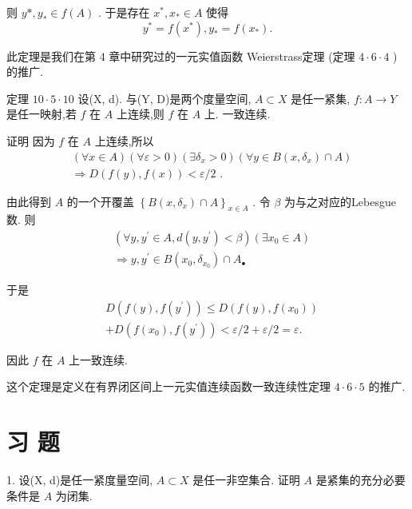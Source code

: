 则 $y * ,{y}_{ * } \in  f\left( A\right)$ . 于是存在 ${x}^{ * },{x}_{ * } \in  A$ 使得
$${y}^{ * } = f\left( {x}^{ * }\right) ,{y}_{ * } = f\left( {x}_{ * }\right) .$$

此定理是我们在第 4 章中研究过的一元实值函数 Weierstrass定理 (定理 $4 \cdot  6 \cdot  4$ ) 的推广.

定理 ${10} \cdot  5 \cdot  {10}$ 设(X, d). 与(Y, D)是两个度量空间, $A \subset  X$ 是任一紧集, $f : A \rightarrow  Y$ 是任一映射,若 $f$ 在 $A$ 上连续,则 $f$ 在 $A$ 上. 一致连续.

证明 因为 $f$ 在 $A$ 上连续,所以
\begin{align*}
	&\left( {\forall x \in  A}\right) \left( {\forall \varepsilon  > 0}\right) \left( {\exists {\delta }_{x} > 0}\right) \left( {\forall y \in  B\left( {x,{\delta }_{x}}\right)  \cap  A}\right)\\
	&\Rightarrow  D\left( {f\left( y\right) ,f\left( x\right) }\right)  < \varepsilon /2\text{ . }
\end{align*}

由此得到 $A$ 的一个开覆盖 ${\left\{  B\left( x,{\delta }_{x}\right)  \cap  A\right\}  }_{x \in  A}$ . 令 $\beta$ 为与之对应的Lebesgue数. 则
\begin{align*}
	&\left( {\forall y,{y}^{\prime } \in  A,d\left( {y,{y}^{\prime }}\right)  < \beta }\right) \left( {\exists {x}_{0} \in  A}\right)\\
	&\Rightarrow  y,{y}^{\prime } \in  B\left( {{x}_{0},{\delta }_{{x}_{0}}}\right)  \cap  {A}_{ \bullet  }
\end{align*}

于是
\begin{align*}
	&D\left( {f\left( y\right) ,f\left( {y}^{\prime }\right) }\right)  \leq  D\left( {f\left( y\right) ,f\left( {x}_{0}\right) }\right)\\
	&+ D\left( {f\left( {x}_{0}\right) ,f\left( {y}^{\prime }\right) }\right)  < \varepsilon /2 + \varepsilon /2 = \varepsilon .
\end{align*}

因此 $f$ 在 $A$ 上一致连续.

这个定理是定义在有界闭区间上一元实值连续函数一致连续性定理 $4 \cdot  6 \cdot  5$ 的推广.

\section*{习 题}

1. 设(X, d)是任一紧度量空间, $A \subset  X$ 是任一非空集合. 证明 $A$ 是紧集的充分必要条件是 $A$ 为闭集.


